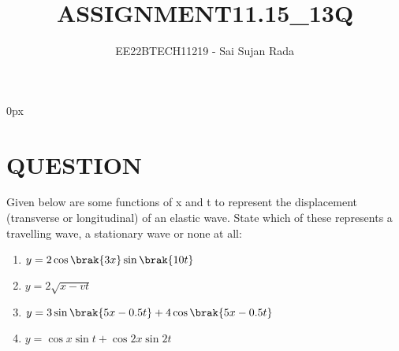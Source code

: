 \documentclass[journal,12pt,twocolumn]{IEEEtran}
\theoremstyle{remark}
\begin{document}
\parindent 0px

\title{ASSIGNMENT11.15\_13Q}
\author{EE22BTECH11219 - Sai Sujan Rada$^{}$%
}
\maketitle
\newpage
\bigskip
\section*{QUESTION}
Given below are some functions of x and t to 
represent the displacement (transverse
or longitudinal) of an elastic wave. State which of these represents \brak a travelling
wave,  a stationary wave or  none at all: \\
\begin{enumerate}
\item $y = 2\cos \brak{3x} \sin \brak{10t}$
\item $y=2\sqrt{x-vt}$
\item $y = 3\sin \brak{5x - 0.5t} + 4\cos \brak{5x - 0.5t}$
\item $y = \cos x \sin t + \cos 2x \sin 2t$
\end{enumerate}
\solution 
\end{document}
